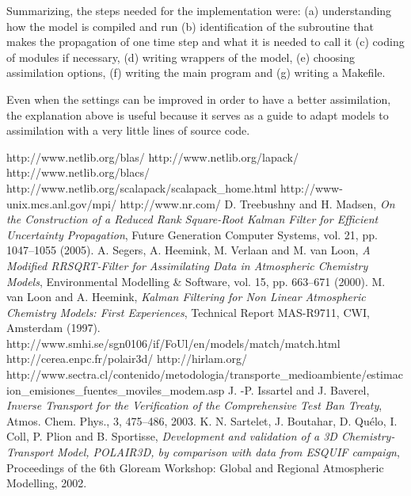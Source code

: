 \documentclass[12pt]{article}
\begin{document}
Summarizing, the steps needed for the implementation were: (a) understanding how the model is compiled and run (b) identification of the subroutine that makes the propagation of one time step and what it is needed to call it (c) coding of modules if necessary, (d) writing wrappers of the model, (e) choosing assimilation options, (f) writing the main program and (g) writing a Makefile.

Even when the settings can be improved in order to have a better assimilation, the explanation above is useful because it serves as a guide to adapt models to assimilation with a very little lines of source code. 

\begin{thebibliography}{99}
 http://www.netlib.org/blas/
 http://www.netlib.org/lapack/
 http://www.netlib.org/blacs/
 http://www.netlib.org/scalapack/scalapack\_home.html
 http://www-unix.mcs.anl.gov/mpi/
 http://www.nr.com/
 D. Treebushny and H. Madsen, {\em On the Construction of a Reduced Rank Square-Root Kalman Filter for Efficient Uncertainty Propagation}, Future Generation Computer Systems, vol. 21, pp. 1047--1055 (2005).
 A. Segers, A. Heemink, M. Verlaan and M. van Loon, {\em A Modified RRSQRT-Filter for Assimilating Data in Atmospheric Chemistry Models}, Environmental Modelling \& Software, vol. 15, pp. 663--671 (2000).
 M. van Loon and A. Heemink, {\em Kalman Filtering for Non Linear Atmospheric Chemistry Models: First Experiences}, Technical Report MAS-R9711, CWI, Amsterdam (1997).
 http://www.smhi.se/sgn0106/if/FoUl/en/models/match/match.html
 http://cerea.enpc.fr/polair3d/
 http://hirlam.org/
 http://www.sectra.cl/contenido/metodologia/transporte\_medio\-ambiente/estimacion\_emi\-sio\-nes\_fuen\-tes\_mo\-vi\-les\_modem.asp
 J. -P. Issartel and J. Baverel, {\em Inverse Transport for the Verification of the Comprehensive Test Ban Treaty}, Atmos. Chem. Phys., 3, 475--486, 2003.
 K. N. Sartelet, J. Boutahar, D. Qu\'elo, I. Coll, P. Plion and B. Sportisse, {\em Development and validation of a 3D Chemistry-Transport Model, POLAIR3D, by comparison with data from ESQUIF campaign}, Proceedings of the 6th Gloream Workshop: Global and Regional Atmospheric Modelling, 2002.
\end{thebibliography}
\end{document}
